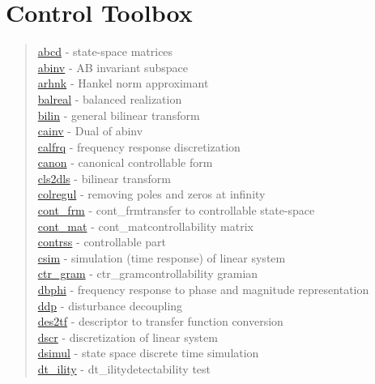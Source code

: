 \chapter*{Control Toolbox}

\begin{quote}
\noindent
\hyperlink{abcd}{abcd} - {state-space matrices} \\  
\hyperlink{abinv}{abinv} - {AB invariant subspace} \\  
\hyperlink{arhnk}{arhnk} - {Hankel norm approximant} \\  
\hyperlink{balreal}{balreal} - {balanced realization} \\  
\hyperlink{bilin}{bilin} - {general bilinear transform} \\  
\hyperlink{cainv}{cainv} - { Dual of abinv} \\  
\hyperlink{calfrq}{calfrq} - {frequency response discretization} \\  
\hyperlink{canon}{canon} - {canonical controllable form} \\  
\hyperlink{cls2dls}{cls2dls} - {bilinear transform} \\  
\hyperlink{colregul}{colregul} - {removing poles and zeros at infinity} \\  
\hyperlink{cont_frm}{cont\_frm} - {cont_frm}{transfer to controllable state-space} \\  
\hyperlink{cont_mat}{cont\_mat} - {cont_mat}{controllability matrix} \\  
\hyperlink{contrss}{contrss} - {controllable part} \\  
\hyperlink{csim}{csim} - {simulation (time response) of linear system} \\  
\hyperlink{ctr_gram}{ctr\_gram} - {ctr_gram}{controllability gramian} \\  
\hyperlink{dbphi}{dbphi} - {frequency response to phase and magnitude representation} \\  
\hyperlink{ddp}{ddp} - {disturbance decoupling} \\  
\hyperlink{des2tf}{des2tf} - {descriptor to transfer function conversion} \\  
\hyperlink{dscr}{dscr} - { discretization of linear system} \\  
\hyperlink{dsimul}{dsimul} - { state space discrete time simulation} \\  
\hyperlink{dt_ility}{dt\_ility} - {dt_ility}{detectability test} \\  

\end{quote}
